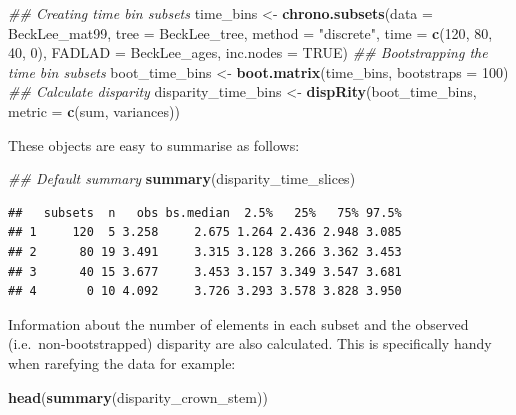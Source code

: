 \documentclass[
]{book}
\newenvironment{Shaded}{\begin{snugshade}}{\end{snugshade}}
\newcommand{\CommentTok}[1]{\textcolor[rgb]{0.56,0.35,0.01}{\textit{#1}}}
\newcommand{\DataTypeTok}[1]{\textcolor[rgb]{0.13,0.29,0.53}{#1}}
\newcommand{\DecValTok}[1]{\textcolor[rgb]{0.00,0.00,0.81}{#1}}
\newcommand{\KeywordTok}[1]{\textcolor[rgb]{0.13,0.29,0.53}{\textbf{#1}}}
\newcommand{\NormalTok}[1]{#1}
\newcommand{\OtherTok}[1]{\textcolor[rgb]{0.56,0.35,0.01}{#1}}
\newcommand{\StringTok}[1]{\textcolor[rgb]{0.31,0.60,0.02}{#1}}
\begin{document}
\begin{Shaded}
\begin{Highlighting}[]
\CommentTok{\#\# Creating time bin subsets}
\NormalTok{time\_bins \textless{}{-}}\StringTok{ }\KeywordTok{chrono.subsets}\NormalTok{(}\DataTypeTok{data =}\NormalTok{ BeckLee\_mat99,}
                            \DataTypeTok{tree =}\NormalTok{ BeckLee\_tree, }
                            \DataTypeTok{method =} \StringTok{"discrete"}\NormalTok{,}
                            \DataTypeTok{time =} \KeywordTok{c}\NormalTok{(}\DecValTok{120}\NormalTok{, }\DecValTok{80}\NormalTok{, }\DecValTok{40}\NormalTok{, }\DecValTok{0}\NormalTok{),}
                            \DataTypeTok{FADLAD =}\NormalTok{ BeckLee\_ages,}
                            \DataTypeTok{inc.nodes =} \OtherTok{TRUE}\NormalTok{)}
\CommentTok{\#\# Bootstrapping the time bin subsets}
\NormalTok{boot\_time\_bins \textless{}{-}}\StringTok{ }\KeywordTok{boot.matrix}\NormalTok{(time\_bins, }\DataTypeTok{bootstraps =} \DecValTok{100}\NormalTok{)}
\CommentTok{\#\# Calculate disparity}
\NormalTok{disparity\_time\_bins \textless{}{-}}\StringTok{ }\KeywordTok{dispRity}\NormalTok{(boot\_time\_bins,}
                                \DataTypeTok{metric =} \KeywordTok{c}\NormalTok{(sum, variances))}
\end{Highlighting}
\end{Shaded}

These objects are easy to summarise as follows:

\begin{Shaded}
\begin{Highlighting}[]
\CommentTok{\#\# Default summary}
\KeywordTok{summary}\NormalTok{(disparity\_time\_slices)}
\end{Highlighting}
\end{Shaded}

\begin{verbatim}
##   subsets  n   obs bs.median  2.5%   25%   75% 97.5%
## 1     120  5 3.258     2.675 1.264 2.436 2.948 3.085
## 2      80 19 3.491     3.315 3.128 3.266 3.362 3.453
## 3      40 15 3.677     3.453 3.157 3.349 3.547 3.681
## 4       0 10 4.092     3.726 3.293 3.578 3.828 3.950
\end{verbatim}

Information about the number of elements in each subset and the observed (i.e.~non-bootstrapped) disparity are also calculated.
This is specifically handy when rarefying the data for example:

\begin{Shaded}
\begin{Highlighting}[]
\KeywordTok{head}\NormalTok{(}\KeywordTok{summary}\NormalTok{(disparity\_crown\_stem))}
\end{Highlighting}
\end{Shaded}
\end{document}
